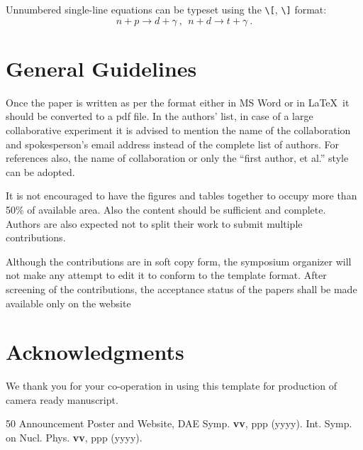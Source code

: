 \documentclass[twocolumn,amsmath,amssymb]{snp}
\begin{document}
Unnumbered single-line equations can be typeset
using the \verb+\[+, \verb+\]+ format:
\[n+p \rightarrow d+\gamma ~,~~n+d\rightarrow
t+\gamma ~. \] 



\section*{General Guidelines}
Once the paper is written as per the format either in MS Word or in \LaTeX\, it should be converted to a pdf file. 
In the authors' list, in 
case of a large collaborative experiment it is advised to mention the name of the collaboration and spokesperson's 
email address instead of the complete list of authors. For references also, the name of collaboration or only the 
``first author, et al.'' style can be adopted. 

It is not encouraged to have the figures and tables together to occupy more than 50\% of available area. Also the content should be sufficient and complete. Authors are also expected not to split their work to submit multiple contributions.

Although the contributions are in soft copy form, the symposium organizer will not make any attempt to 
edit it to conform to the template format.  After screening of the contributions, the 
acceptance status of the papers shall be made available only on the website 


\section*{Acknowledgments}
 We thank you for your co-operation in using this template  for production of camera ready manuscript.

\begin{thebibliography}{50}
 Announcement Poster and Website, DAE Symp. {\bf vv}, ppp (yyyy).
 Int. Symp. on Nucl. Phys. {\bf vv}, ppp (yyyy).
\end{thebibliography}
\end{document}
